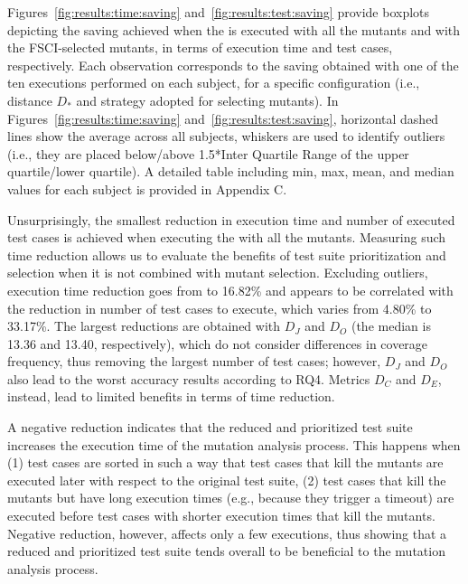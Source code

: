 Figures~\ref{fig:results:time:saving} and~\ref{fig:results:test:saving} provide boxplots depicting 
the saving achieved when the \MPTS is executed with all the mutants and with the FSCI-selected mutants, in terms of execution time and test cases, respectively. Each observation corresponds to the saving obtained with one of the ten executions performed on each subject, for a specific configuration (i.e., distance $D_*$ and strategy adopted for selecting mutants). In Figures~\ref{fig:results:time:saving} and~\ref{fig:results:test:saving}, horizontal dashed lines show the average across all subjects, whiskers are used to identify outliers (i.e., they are placed below/above 1.5*Inter Quartile Range of the upper quartile/lower quartile). A detailed table including min, max, mean, and median values for each subject is provided in Appendix C.


Unsurprisingly, the smallest reduction in execution time and number of executed test cases is achieved when executing the \MPTS with all the mutants. 
Measuring such time reduction allows us to evaluate the benefits of test suite prioritization and selection when it is not combined with mutant selection.
Excluding outliers, execution time reduction goes from   %
to 16.82\% and appears to be correlated with the reduction in number of test cases to execute, which varies from 4.80\% to 33.17\%.
The largest reductions are obtained with $D_J$ and $D_O$ (the median is 13.36 and 13.40, respectively), which do not consider differences in coverage frequency, thus removing the largest number of test cases; however, $D_J$ and $D_O$ also lead to the worst accuracy results according to RQ4. Metrics $D_C$ and $D_E$, instead, lead to limited benefits in terms of time reduction.

A negative reduction indicates that the reduced and prioritized test suite increases the execution time of the mutation analysis process. This happens when (1) test cases are sorted in such a way that test cases that kill the mutants are executed later with respect to the original test suite, (2) test cases that kill the mutants but have long execution times (e.g., because they trigger a timeout) are executed before test cases with shorter execution times that kill the mutants. Negative reduction, however, affects only a few executions, thus showing that a reduced and prioritized test suite tends overall to be beneficial to the mutation analysis process.



